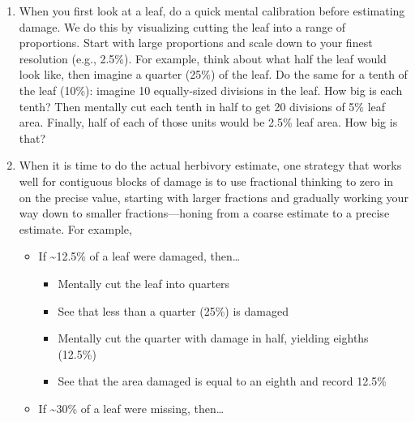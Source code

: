 \documentclass[
  letterpaper,
  oneside,
  open=any]{scrbook}
\providecommand{\tightlist}{%
  \setlength{\itemsep}{0pt}\setlength{\parskip}{0pt}}\usepackage{longtable,booktabs,array}
\begin{document}
\begin{enumerate}
\def\labelenumi{\arabic{enumi}.}
\setcounter{enumi}{1}
\item
  When you first look at a leaf, do a quick mental calibration before
  estimating damage. We do this by visualizing cutting the leaf into a
  range of proportions. Start with large proportions and scale down to
  your finest resolution (e.g., 2.5\%). For example, think about what
  half the leaf would look like, then imagine a quarter (25\%) of the
  leaf. Do the same for a tenth of the leaf (10\%): imagine 10
  equally-sized divisions in the leaf. How big is each tenth? Then
  mentally cut each tenth in half to get 20 divisions of 5\% leaf area.
  Finally, half of each of those units would be 2.5\% leaf area. How big
  is that?
\item
  When it is time to do the actual herbivory estimate, one strategy that
  works well for contiguous blocks of damage is to use fractional
  thinking to zero in on the precise value, starting with larger
  fractions and gradually working your way down to smaller
  fractions---honing from a coarse estimate to a precise estimate. For
  example,

  \begin{itemize}
  \item
    If \textasciitilde12.5\% of a leaf were damaged, then\ldots{}

    \begin{itemize}
    \tightlist
    \item
      Mentally cut the leaf into quarters
    \item
      See that less than a quarter (25\%) is damaged
    \item
      Mentally cut the quarter with damage in half, yielding eighths
      (12.5\%)
    \item
      See that the area damaged is equal to an eighth and record 12.5\%
    \end{itemize}
  \item
    If \textasciitilde30\% of a leaf were missing, then\ldots{}


\end{itemize}
\end{enumerate}
\end{document}
